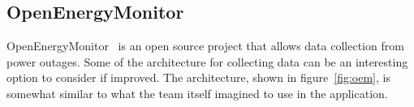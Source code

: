 \begin{figure}[H]
\label{fig:smartly}
  \centering
\quad
\end{figure}


\subsection{OpenEnergyMonitor}

OpenEnergyMonitor~\cite{openenergymonitor} is an open source project that allows data collection from power outages. Some of the architecture for collecting data can be an interesting option to consider if improved. The architecture, shown in figure~\ref{fig:oem}, is somewhat similar to what the team itself imagined to use in the application. 

